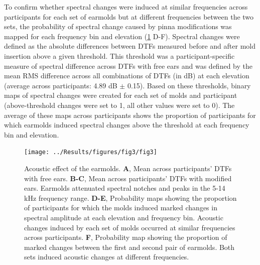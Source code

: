 To confirm whether spectral changes were induced at similar frequencies across participants for each set of earmolds but at different frequencies between the two sets, the probability of spectral change caused by pinna modifications was mapped for each frequency bin and elevation (\cref{fig:spectral_change} D-F). Spectral changes were defined as the absolute differences between DTFs measured before and after mold insertion above a given threshold. This threshold was a participant-specific measure of spectral difference across DTFs with free ears and was defined by the mean RMS difference across all combinations of DTFs (in dB) at each elevation (average across participants: 4.89 dB $\pm$ 0.15). Based on these thresholds, binary maps of spectral changes were created for each set of molds and participant (above-threshold changes were set to 1, all other values were set to 0). The average of these maps across participants shows the proportion of participants for which earmolds induced spectral changes above the threshold at each frequency bin and elevation.

\begin{figure}[h]
\centering
	\centerline{\texttt{[image: ../Results/figures/fig3/fig3]}}
	\caption{Acoustic effect of the earmolds. \textbf{A}, Mean across participants' DTFs with free ears. \textbf{B-C}, Mean across participants' DTFs with modified ears. Earmolds attenuated spectral notches and peaks in the 5-14 kHz frequency range. \textbf{D-E}, Probability maps showing the proportion of participants for which the molds induced marked changes in spectral amplitude at each elevation and frequency bin. Acoustic changes induced by each set of molds occurred at similar frequencies across participants. \textbf{F}, Probability map showing the proportion of marked changes between the first and second pair of earmolds. Both sets induced acoustic changes at different frequencies.}
        \label{fig:spectral_change}
\end{figure}

